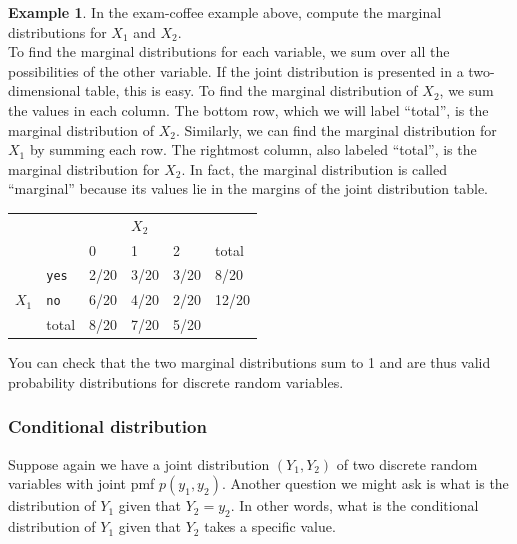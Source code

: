\documentclass[12pt]{article}
\theoremstyle{definition}
\newtheorem*{example}{Example}
\theoremstyle{remark}
\begin{document}
\begin{example}In the exam-coffee example above, compute the marginal distributions for $X_1$ and $X_2$.\\

To find the marginal distributions for each variable, we sum over all the possibilities of the other variable. If the joint distribution is presented in a two-dimensional table, this is easy. To find the marginal distribution of $X_2$, we sum the values in each column. The bottom row, which we will label ``total'', is the marginal distribution of $X_2$. Similarly, we can find the marginal distribution for $X_1$ by summing each row. The rightmost column, also labeled ``total'', is the marginal distribution for $X_2$. In fact, the marginal distribution is called ``marginal'' because its values lie in the margins of the joint distribution table.

\begin{table}[H]
\centering
\begin{tabular}{llllll}
                       &                                 &      & $X_2$   &                           &       \\ \cline{3-5}
                       &                                 & 0    & 1    & 2                         & total \\ \cline{3-5}
\multicolumn{1}{l|}{}  & \multicolumn{1}{l|}{\texttt{yes}}    & 2/20 & 3/20 & \multicolumn{1}{l|}{3/20} & 8/20  \\
\multicolumn{1}{l|}{$X_1$} & \multicolumn{1}{l|}{\texttt{no}} & 6/20 & 4/20 & \multicolumn{1}{l|}{2/20} & 12/20 \\ \cline{3-5}
                       & total                           & 8/20 & 7/20 & 5/20                      &      
\end{tabular}
\end{table}
You can check that the two marginal distributions sum to 1 and are thus valid probability distributions for discrete random variables.

\end{example}

\subsubsection{Conditional distribution}
Suppose again we have a joint distribution $(Y_1, Y_2)$ of two discrete random variables with joint pmf $p(y_1, y_2)$. Another question we might ask is what is the distribution of $Y_1$ given that $Y_2 = y_2$. In other words, what is the conditional distribution of $Y_1$ given that $Y_2$ takes a specific value.\\
\end{document}
